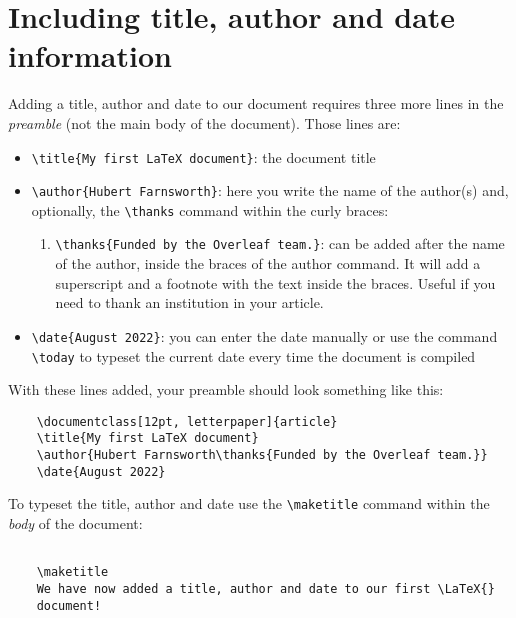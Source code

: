 \section{Including title, author and date information}

Adding a title, author and date to our document requires three more lines in the \emph{preamble} (not the main body of the document). Those lines are:

\begin{itemize}
    \item \verb|\title{My first LaTeX document}|: the document title
    \item \verb|\author{Hubert Farnsworth}|: here you write the name of the author(s) and, optionally, the \verb|\thanks| command within the curly braces:
    \begin{enumerate}
        \item \verb|\thanks{Funded by the Overleaf team.}|: can be added after the name of the author, inside the braces of the author command. It will add a superscript and a footnote with the text inside the braces. Useful if you need to thank an institution in your article.
    \end{enumerate}
    \item \verb|\date{August 2022}|: you can enter the date manually or use the command \verb|\today| to typeset the current date every time the document is compiled
\end{itemize}

With these lines added, your preamble should look something like this:

\begin{tcolorbox}
\begin{verbatim}
    \documentclass[12pt, letterpaper]{article}
    \title{My first LaTeX document}
    \author{Hubert Farnsworth\thanks{Funded by the Overleaf team.}}
    \date{August 2022}
\end{verbatim}
\end{tcolorbox}

To typeset the title, author and date use the \verb|\maketitle| command within the \emph{body} of the document:

\begin{tcolorbox}
\begin{verbatim}
    
    \maketitle
    We have now added a title, author and date to our first \LaTeX{} 
    document!
    
\end{verbatim}
\end{tcolorbox}

